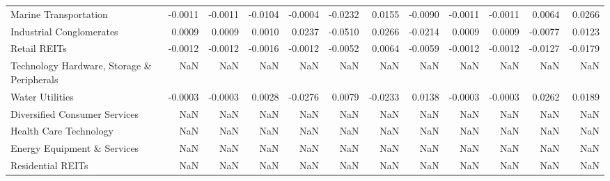 \begin{table}
\begin{tabular}{lrrrrrrrrrrr}
Marine Transportation & -0.0011 & -0.0011 & -0.0104 & -0.0004 & -0.0232 & 0.0155 & -0.0090 & -0.0011 & -0.0011 & 0.0064 & 0.0266 \\
Industrial Conglomerates & 0.0009 & 0.0009 & 0.0010 & 0.0237 & -0.0510 & 0.0266 & -0.0214 & 0.0009 & 0.0009 & -0.0077 & 0.0123 \\
Retail REITs & -0.0012 & -0.0012 & -0.0016 & -0.0012 & -0.0052 & 0.0064 & -0.0059 & -0.0012 & -0.0012 & -0.0127 & -0.0179 \\
Technology Hardware, Storage \& Peripherals & NaN & NaN & NaN & NaN & NaN & NaN & NaN & NaN & NaN & NaN & NaN \\
Water Utilities & -0.0003 & -0.0003 & 0.0028 & -0.0276 & 0.0079 & -0.0233 & 0.0138 & -0.0003 & -0.0003 & 0.0262 & 0.0189 \\
Diversified Consumer Services & NaN & NaN & NaN & NaN & NaN & NaN & NaN & NaN & NaN & NaN & NaN \\
Health Care Technology & NaN & NaN & NaN & NaN & NaN & NaN & NaN & NaN & NaN & NaN & NaN \\
Energy Equipment \& Services & NaN & NaN & NaN & NaN & NaN & NaN & NaN & NaN & NaN & NaN & NaN \\
Residential REITs & NaN & NaN & NaN & NaN & NaN & NaN & NaN & NaN & NaN & NaN & NaN \\
\bottomrule
\end{tabular}
\end{table}
